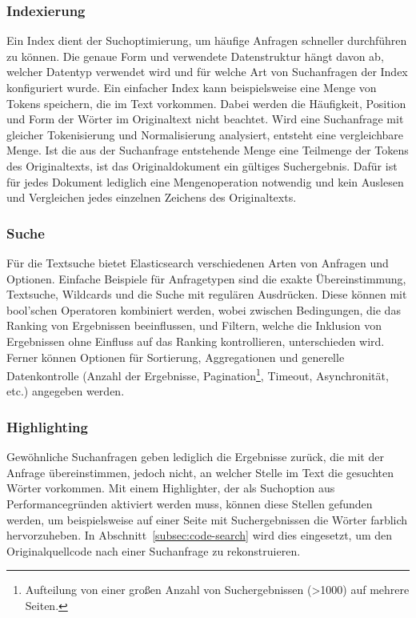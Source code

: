 \subsubsection{Indexierung}
Ein Index dient der Suchoptimierung, um häufige Anfragen schneller durchführen zu können.
Die genaue Form und verwendete Datenstruktur hängt davon ab, welcher Datentyp verwendet wird und für welche Art von Suchanfragen der Index konfiguriert wurde.
Ein einfacher Index kann beispielsweise eine Menge von Tokens speichern, die im Text vorkommen.
Dabei werden die Häufigkeit, Position und Form der Wörter im Originaltext nicht beachtet.
Wird eine Suchanfrage mit gleicher Tokenisierung und Normalisierung analysiert, entsteht eine vergleichbare Menge.
Ist die aus der Suchanfrage entstehende Menge eine Teilmenge der Tokens des Originaltexts, ist das Originaldokument ein gültiges Suchergebnis.
Dafür ist für jedes Dokument lediglich eine Mengenoperation notwendig und kein Auslesen und Vergleichen jedes einzelnen Zeichens des Originaltexts.\cite{elastic-index-search-time}

\subsubsection{Suche}
Für die Textsuche bietet Elasticsearch verschiedenen Arten von Anfragen und Optionen.
Einfache Beispiele für Anfragetypen sind die exakte Übereinstimmung, Textsuche, Wildcards und die Suche mit regulären Ausdrücken.\cite{elastic-query-dsl}
Diese können mit bool'schen Operatoren kombiniert werden, wobei zwischen Bedingungen, die das Ranking von Ergebnissen beeinflussen, und Filtern, welche die Inklusion von Ergebnissen ohne Einfluss auf das Ranking kontrollieren, unterschieden wird.\cite{elastic-bool-query}
Ferner können Optionen für Sortierung, Aggregationen und generelle Datenkontrolle (Anzahl der Ergebnisse, Pagination\footnote{Aufteilung von einer großen Anzahl von Suchergebnissen (>1000) auf mehrere Seiten.}, Timeout, Asynchronität, etc.) angegeben werden.\cite{elastic-search-data}

\subsubsection{Highlighting}
Gewöhnliche Suchanfragen geben lediglich die Ergebnisse zurück, die mit der Anfrage übereinstimmen, jedoch nicht, an welcher Stelle im Text die gesuchten Wörter vorkommen.
Mit einem Highlighter, der als Suchoption aus Performancegründen aktiviert werden muss, können diese Stellen gefunden werden, um beispielsweise auf einer Seite mit Suchergebnissen die Wörter farblich hervorzuheben.\cite{elastic-highlighting}
In Abschnitt~\ref{subsec:code-search} wird dies eingesetzt, um den Originalquellcode nach einer Suchanfrage zu rekonstruieren.

